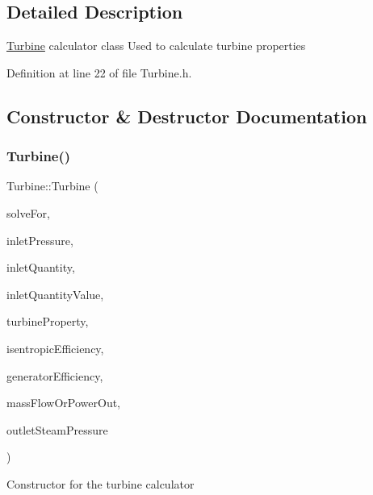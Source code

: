 \subsection{Detailed Description}
\hyperlink{class_turbine}{Turbine} calculator class Used to calculate turbine properties 

Definition at line 22 of file Turbine.\+h.



\subsection{Constructor \& Destructor Documentation}
\mbox{\label{class_turbine_a3c3c871b9fe57d48dd06b109794381dc}} 
\subsubsection{\texorpdfstring{Turbine()}{Turbine()}\hspace{0.1cm}{\footnotesize\ttfamily [1/6]}}
{\footnotesize\ttfamily Turbine\+::\+Turbine (\begin{DoxyParamCaption}\item[{\hyperlink{class_turbine_a9fd7beba6c6f071e228fbe3e07969d2b}{Solve}}]{solve\+For,  }\item[{double}]{inlet\+Pressure,  }\item[{\hyperlink{class_steam_properties_ae0294bedf7d178c2d8fb6aed0f62fbff}{Steam\+Properties\+::\+Thermodynamic\+Quantity}}]{inlet\+Quantity,  }\item[{double}]{inlet\+Quantity\+Value,  }\item[{\hyperlink{class_turbine_a5db4f65cf2539e3837684d53221ade12}{Turbine\+Property}}]{turbine\+Property,  }\item[{double}]{isentropic\+Efficiency,  }\item[{double}]{generator\+Efficiency,  }\item[{double}]{mass\+Flow\+Or\+Power\+Out,  }\item[{double}]{outlet\+Steam\+Pressure }\end{DoxyParamCaption})}

Constructor for the turbine calculator


